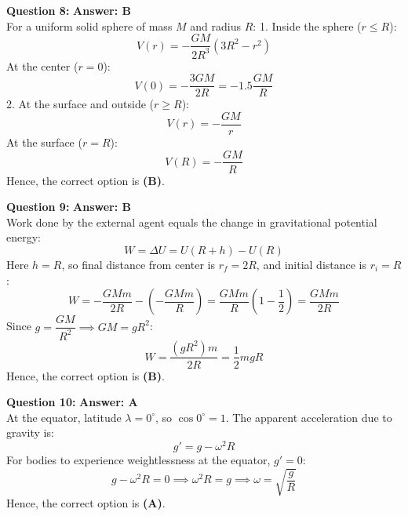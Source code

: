 \documentclass[11pt,a4paper]{article}
\begin{document}
\begin{tcolorbox}[solbox]
  \textbf{\textcolor{primaryDark}{Question 8:}} \hfill \textbf{\textcolor{l1Green}{Answer: B}}\\
  \vspace{3pt}
  For a uniform solid sphere of mass $M$ and radius $R$:
1. Inside the sphere ($r \le R$):
$$V(r) = -\frac{GM}{2R^3}(3R^2 - r^2)$$
At the center ($r = 0$):
$$V(0) = -\frac{3GM}{2R} = -1.5 \frac{GM}{R}$$
\vspace{3pt}
2. At the surface and outside ($r \ge R$):
$$V(r) = -\frac{GM}{r}$$
At the surface ($r = R$):
$$V(R) = -\frac{GM}{R}$$
\vspace{3pt}
Hence, the correct option is \textbf{(B)}.
\end{tcolorbox}
\vspace{3pt}

\begin{tcolorbox}[solbox]
  \textbf{\textcolor{primaryDark}{Question 9:}} \hfill \textbf{\textcolor{l1Green}{Answer: B}}\\
  \vspace{3pt}
  Work done by the external agent equals the change in gravitational potential energy:
$$W = \Delta U = U(R + h) - U(R)$$
\vspace{3pt}
Here $h = R$, so final distance from center is $r_f = 2R$, and initial distance is $r_i = R$:
$$W = -\frac{GMm}{2R} - \left(-\frac{GMm}{R}\right) = \frac{GMm}{R}\left(1 - \frac{1}{2}\right) = \frac{GMm}{2R}$$
\vspace{3pt}
Since $g = \dfrac{GM}{R^2} \implies GM = g R^2$:
$$W = \frac{(g R^2) m}{2R} = \frac{1}{2}mgR$$
\vspace{3pt}
Hence, the correct option is \textbf{(B)}.
\end{tcolorbox}
\vspace{3pt}

\begin{tcolorbox}[solbox]
  \textbf{\textcolor{primaryDark}{Question 10:}} \hfill \textbf{\textcolor{l1Green}{Answer: A}}\\
  \vspace{3pt}
  At the equator, latitude $\lambda = 0^\circ$, so $\cos 0^\circ = 1$.
\vspace{3pt}
The apparent acceleration due to gravity is:
$$g' = g - \omega^2 R$$
\vspace{3pt}
For bodies to experience weightlessness at the equator, $g' = 0$:
$$g - \omega^2 R = 0 \implies \omega^2 R = g \implies \omega = \sqrt{\frac{g}{R}}$$
\vspace{3pt}
Hence, the correct option is \textbf{(A)}.
\end{tcolorbox}
\vspace{3pt}
\end{document}
